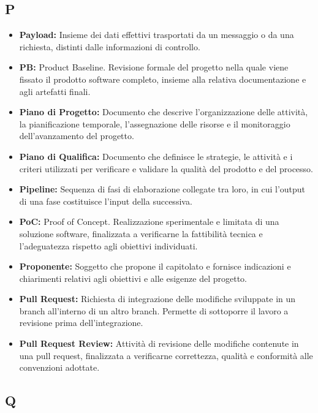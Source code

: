 {}
\subsection*{P}

\begin{itemize}
    \item \textbf{Payload:} Insieme dei dati effettivi trasportati da un messaggio o da una richiesta, distinti dalle informazioni di controllo.
    \item \textbf{PB:} Product Baseline. Revisione formale del progetto nella quale viene fissato il prodotto software completo, insieme alla relativa documentazione e agli artefatti finali.
    \item \textbf{Piano di Progetto:} Documento che descrive l'organizzazione delle attività, la pianificazione temporale, l'assegnazione delle risorse e il monitoraggio dell'avanzamento del progetto.
    \item \textbf{Piano di Qualifica:} Documento che definisce le strategie, le attività e i criteri utilizzati per verificare e validare la qualità del prodotto e del processo.
    \item \textbf{Pipeline:} Sequenza di fasi di elaborazione collegate tra loro, in cui l'output di una fase costituisce l'input della successiva.
    \item \textbf{PoC:} Proof of Concept. Realizzazione sperimentale e limitata di una soluzione software, finalizzata a verificarne la fattibilità tecnica e l'adeguatezza rispetto agli obiettivi individuati.
    \item \textbf{Proponente:} Soggetto che propone il capitolato e fornisce indicazioni e chiarimenti relativi agli obiettivi e alle esigenze del progetto.
    \item \textbf{Pull Request:} Richiesta di integrazione delle modifiche sviluppate in un branch all'interno di un altro branch. Permette di sottoporre il lavoro a revisione prima dell'integrazione.
    \item \textbf{Pull Request Review:} Attività di revisione delle modifiche contenute in una pull request, finalizzata a verificarne correttezza, qualità e conformità alle convenzioni adottate.
\end{itemize}


{}
\subsection*{Q}

